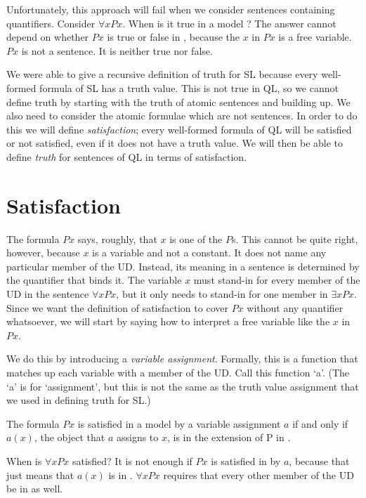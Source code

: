 Unfortunately, this approach will fail when we consider sentences containing quantifiers. Consider $\forall x Px$. When is it true in a model ? The answer cannot depend on whether $Px$ is true or false in , because the $x$ in $Px$ is a free variable. $Px$ is not a sentence. It is neither true nor false.

We were able to give a recursive definition of truth for SL because every well-formed formula of SL has a truth value. This is not true in QL, so we cannot define truth by starting with the truth of atomic sentences and building up. We also need to consider the atomic formulae which are not sentences. In order to do this we will define \emph{satisfaction}; every well-formed formula of QL will be satisfied or not satisfied, even if it does not have a truth value. We will then be able to define \emph{truth} for sentences of QL in terms of satisfaction.


\section{Satisfaction}

The formula $Px$ says, roughly, that $x$ is one of the $P$s. This cannot be quite right, however, because $x$ is a variable and not a constant. It does not name any particular member of the UD. Instead, its meaning in a sentence is determined by the quantifier that binds it. The variable $x$ must stand-in for every member of the UD in the sentence $\forall xPx$, but it only needs to stand-in for one member in $\exists xPx$. Since we want the definition of satisfaction to cover $Px$ without any quantifier whatsoever, we will start by saying how to interpret a free variable like the $x$ in $Px$.

We do this by introducing a \emph{variable assignment}. Formally, this is a function that matches up each variable with a member of the UD. Call this function `a'. (The `a' is for `assignment', but this is not the same as the truth value assignment that we used in defining truth for SL.)

The formula $Px$ is satisfied in a model  by a variable assignment $a$ if and only if $a(x)$, the object that $a$ assigns to $x$, is in the  extension of P in .

When is $\forall x Px$ satisfied? It is not enough if $Px$ is satisfied in  by $a$, because that just means that $a(x)$ is in . $\forall x Px$ requires that every other member of the UD be in  as well.

